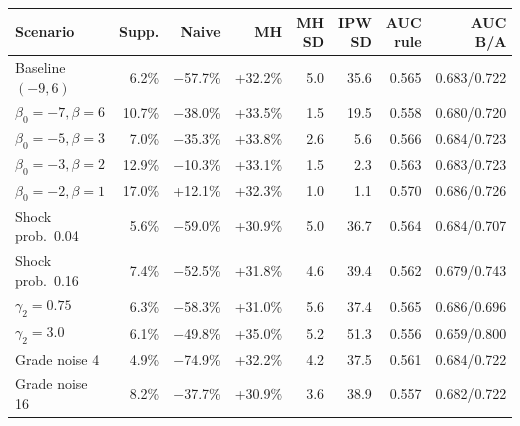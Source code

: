 \setlength{\tabcolsep}{3.5pt}\begin{tabular}{@{}lrrrrrrr@{}}\toprule
Scenario & Supp. & Naive & MH & MH SD & IPW SD & AUC rule & AUC B/A \\
\midrule
Baseline $(-9,6)$ & 6.2\% & $-$57.7\% & +32.2\% & 5.0 & 35.6 & 0.565 & 0.683/0.722 \\
$\beta_0{=}-7,\beta{=}6$ & 10.7\% & $-$38.0\% & +33.5\% & 1.5 & 19.5 & 0.558 & 0.680/0.720 \\
$\beta_0{=}-5,\beta{=}3$ & 7.0\% & $-$35.3\% & +33.8\% & 2.6 & 5.6 & 0.566 & 0.684/0.723 \\
$\beta_0{=}-3,\beta{=}2$ & 12.9\% & $-$10.3\% & +33.1\% & 1.5 & 2.3 & 0.563 & 0.683/0.723 \\
$\beta_0{=}-2,\beta{=}1$ & 17.0\% & +12.1\% & +32.3\% & 1.0 & 1.1 & 0.570 & 0.686/0.726 \\
Shock prob.\ 0.04 & 5.6\% & $-$59.0\% & +30.9\% & 5.0 & 36.7 & 0.564 & 0.684/0.707 \\
Shock prob.\ 0.16 & 7.4\% & $-$52.5\% & +31.8\% & 4.6 & 39.4 & 0.562 & 0.679/0.743 \\
$\gamma_2{=}0.75$ & 6.3\% & $-$58.3\% & +31.0\% & 5.6 & 37.4 & 0.565 & 0.686/0.696 \\
$\gamma_2{=}3.0$ & 6.1\% & $-$49.8\% & +35.0\% & 5.2 & 51.3 & 0.556 & 0.659/0.800 \\
Grade noise 4 & 4.9\% & $-$74.9\% & +32.2\% & 4.2 & 37.5 & 0.561 & 0.684/0.722 \\
Grade noise 16 & 8.2\% & $-$37.7\% & +30.9\% & 3.6 & 38.9 & 0.557 & 0.682/0.722 \\
\bottomrule
\end{tabular}
